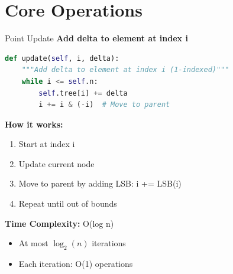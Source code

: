 \documentclass[aspectratio=169]{beamer}
\begin{document}
\section{Core Operations}

\begin{frame}[fragile]{Point Update}
  \textbf{Add delta to element at index i}

  \begin{lstlisting}[language=Python, basicstyle=\ttfamily\footnotesize]
def update(self, i, delta):
    """Add delta to element at index i (1-indexed)"""
    while i <= self.n:
        self.tree[i] += delta
        i += i & (-i)  # Move to parent
  \end{lstlisting}

  \vspace{0.5cm}
  \textbf{How it works:}
  \begin{enumerate}
    \item Start at index i
    \item Update current node
    \item Move to parent by adding LSB: i += LSB(i)
    \item Repeat until out of bounds
  \end{enumerate}

  \vspace{0.5cm}
  \textbf{Time Complexity:} O(log n)
  \begin{itemize}
    \item At most $\log_2(n)$ iterations
    \item Each iteration: O(1) operations
  \end{itemize}
\end{frame}
\end{document}
